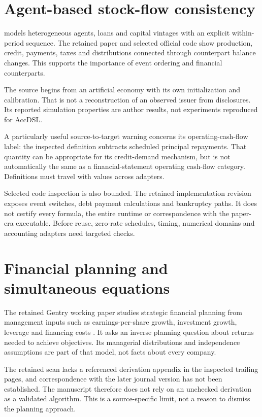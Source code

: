 \section{Agent-based stock-flow consistency}
\citet{caiani2016} models heterogeneous agents, loans and capital vintages with an explicit within-period sequence. The retained paper and selected official code show production, credit, payments, taxes and distributions connected through counterpart balance changes. This supports the importance of event ordering and financial counterparts.

The source begins from an artificial economy with its own initialization and calibration. That is not a reconstruction of an observed issuer from disclosures. Its reported simulation properties are author results, not experiments reproduced for AccDSL.

A particularly useful source-to-target warning concerns its operating-cash-flow label: the inspected definition subtracts scheduled principal repayments. That quantity can be appropriate for its credit-demand mechanism, but is not automatically the same as a financial-statement operating cash-flow category. Definitions must travel with values across adapters.

Selected code inspection is also bounded. The retained implementation revision exposes event switches, debt payment calculations and bankruptcy paths. It does not certify every formula, the entire runtime or correspondence with the paper-era executable. Before reuse, zero-rate schedules, timing, numerical domains and accounting adapters need targeted checks.

\section{Financial planning and simultaneous equations}
The retained Gentry working paper studies strategic financial planning from management inputs such as earnings-per-share growth, investment growth, leverage and financing costs \citep{gentry1974wp}. It asks an inverse planning question about returns needed to achieve objectives. Its managerial distributions and independence assumptions are part of that model, not facts about every company.

The retained scan lacks a referenced derivation appendix in the inspected trailing pages, and correspondence with the later journal version has not been established. The manuscript therefore does not rely on an unchecked derivation as a validated algorithm. This is a source-specific limit, not a reason to dismiss the planning approach.

